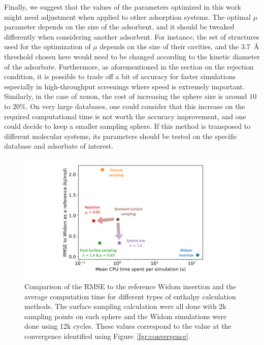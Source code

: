 \documentclass[main]{subfiles}
\begin{document}
Finally, we suggest that the values of the parameters optimized in this work might need adjustment when applied to other adsorption systems. The optimal $\mu$ parameter depends on the size of the adsorbent, and it should be tweaked differently when considering another adsorbent. For instance, the set of structures used for the optimization of $\mu$ depends on the size of their cavities, and the \SI{3.7}{\angstrom} threshold chosen here would need to be changed according to the kinetic diameter of the adsorbate. Furthermore, as aforementioned in the section on the rejection condition, it is possible to trade off a bit of accuracy for faster simulations especially in high-throughput screenings where speed is extremely important. Similarly, in the case of xenon, the cost of increasing the sphere size is around $10$ to {$20$\%}. On very large databases, one could consider that this increase on the required computational time is not worth the accuracy improvement, and one could decide to keep a smaller sampling sphere. If this method is transposed to different molecular systems, its parameters should be tested on the specific database and adsorbate of interest.

\begin{figure}[ht]
  \centering
    \includegraphics[width=\linewidth]{figures/3-fastsim/methods_comparison.png}
    \caption{Comparison of the RMSE to the reference Widom insertion and the average computation time for different types of enthalpy calculation methods. The surface sampling calculation were all done with 2k sampling points on each sphere and the Widom simulations were done using 12k cycles. These values correspond to the value at the convergence identified using Figure~\ref{fgr:convergence}. }\label{fgr:sumup}
  \end{figure}
\end{document}
